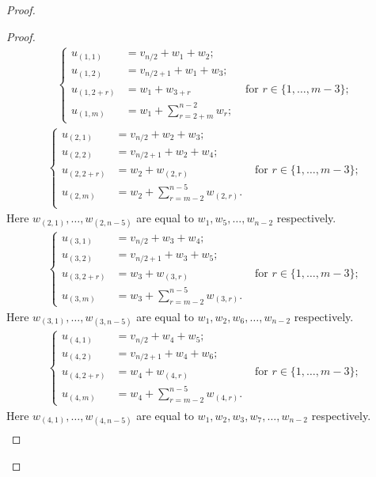 \begin{proof}
\begin{proof}
\begin{gather}\label{orb21}
\left\{ 
\begin{aligned}
u_{(1,1)} & =v_{n/2}+w_1+w_2;\\
u_{(1,2)} & =v_{n/2+1}+w_1+w_3;\\
u_{(1,2+r)} & =w_1+w_{3+r}\phantom{;} &\text{ for } r \in \{1,\ldots, m-3\};\\
u_{(1,m)} & =w_1 +\sum_{r=2+m}^{n-2}w_r;
\end{aligned}
\right.
\end{gather}
\begin{gather}\label{orb212}
\left\{ 
\begin{aligned}
u_{(2,1)} & =v_{n/2}+w_2+w_3;\\
u_{(2,2)} & =v_{n/2+1}+w_2+w_4;\\
u_{(2,2+r)} & =w_2+w_{(2,r)}\phantom{;} &\text{ for } r \in \{1,\ldots, m-3\};\\
u_{(2,m)} & =w_2 +\sum_{r=m-2}^{n-5}w_{(2,r)}.\\
\end{aligned}
\right. 
\end{gather}
Here $w_{(2,1)}, \ldots, w_{(2,n-5)}$ are equal to $w_1, w_5, \ldots, w_{n-2}$ respectively.  
\begin{gather}
\left\{ 
\begin{aligned}
u_{(3,1)} & =v_{n/2}+w_3+w_4;\\
u_{(3,2)} & =v_{n/2+1}+w_3+w_5;\\
u_{(3,2+r)} & =w_3+w_{(3,r)}\phantom{;} &\text{ for } r \in \{1, \ldots, m-3\};\\
u_{(3,m)} & =w_3 +\sum_{r=m-2}^{n-5}w_{(3,r)}.
\end{aligned}
\right.
\end{gather}
Here $w_{(3,1)}, \ldots, w_{(3,n-5)}$ are equal to $w_1, w_2,  w_6, \ldots, w_{n-2}$ respectively.  
\begin{gather} 
\left\{ 
\begin{aligned}\label{orb22}
u_{(4,1)} & =v_{n/2}+w_4+w_5;\\
u_{(4,2)} & =v_{n/2+1}+w_4+w_6;\\
u_{(4,2+r)} & =w_4+w_{(4,r)}\phantom{;} &\text{ for } r \in \{1, \ldots, m-3\};\\
u_{(4,m)} & =w_4 +\sum_{r=m-2}^{n-5}w_{(4,r)}.
\end{aligned}
\right. 
\end{gather}
Here $w_{(4,1)}, \ldots, w_{(4,n-5)}$ are equal to $w_1, w_2, w_3,  w_7, \ldots, w_{n-2}$ respectively.  
\begin{gather} 

\end{gather}
\end{proof}
\end{proof}
